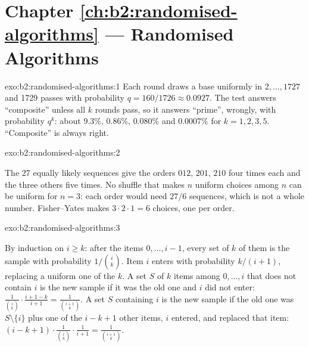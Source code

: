 \section*{Chapter \ref{ch:b2:randomised-algorithms} --- Randomised Algorithms}

\begin{solution}{exo:b2:randomised-algorithms:1}
Each round draws a base uniformly in $2, \dots, 1727$ and 1729 passes with probability $q = 160/1726 \approx 0.0927$. The
test answers ``composite'' unless all $k$ rounds pass, so it answers ``prime'', wrongly, with probability $q^k$: about
$9.3\%$, $0.86\%$, $0.080\%$ and $0.0007\%$ for $k = 1, 2, 3, 5$. ``Composite'' is always right.

\end{solution}

\begin{solution}{exo:b2:randomised-algorithms:2}

The 27 equally likely sequences give the orders $012$, $201$, $210$ four times each and the three others five times. No
shuffle that makes $n$ uniform choices among $n$ can be uniform for $n = 3$: each order would need $27/6$ sequences, which
is not a whole number. Fisher--Yates makes $3 \cdot 2 \cdot 1 = 6$ choices, one per order.
\end{solution}

\begin{solution}{exo:b2:randomised-algorithms:3}


By induction on $i \geq k$: after the items $0, \dots, i - 1$, every set of $k$ of them is the sample with probability
$1/\binom{i}{k}$. Item $i$ enters with probability $k/(i + 1)$, replacing a uniform one of the $k$. A set $S$ of $k$ items
among $0, \dots, i$ that does not contain $i$ is the new sample if it was the old one and $i$ did not enter:
$\frac{1}{\binom{i}{k}} \cdot \frac{i + 1 - k}{i + 1} = \frac{1}{\binom{i + 1}{k}}$. A set $S$ containing $i$ is the new
sample if the old one was $S \setminus \{i\}$ plus one of the $i - k + 1$ other items, $i$ entered, and replaced that
item: $(i - k + 1) \cdot \frac{1}{\binom{i}{k}} \cdot \frac{1}{i + 1} = \frac{1}{\binom{i + 1}{k}}$.
\end{solution}

